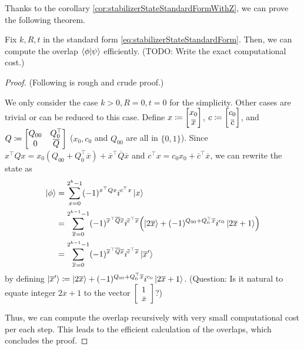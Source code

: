 \documentclass[\main/main]{subfiles}
\begin{document}
Thanks to the corollary \ref{cor:stabilizerStateStandardFormWithZ},
we can prove the following theorem.
\begin{theorem}
    Fix $k,R,t$ in the standard form \eqref{eq:stabilizerStateStandardForm}.
    Then, we can compute the overlap $\braket{\phi}{\psi}$ efficiently.
    (TODO: Write the exact computational cost.)
\end{theorem}
\begin{proof}
    (Following is rough and crude proof.)

    We only consider the case $k>0,R=0,t=0$ for the simplicity.
    Other cases are trivial or can be reduced to this case.
    Define $x \coloneqq \begin{bmatrix}
            x_0 \\
            \overline{x}
        \end{bmatrix}$,
    $c \coloneqq \begin{bmatrix}
            c_0 \\
            \overline{c}
        \end{bmatrix}$, and
    $Q \coloneqq \begin{bmatrix}
            Q_{00} & Q_{0}^\top   \\
            0      & \overline{Q}
        \end{bmatrix}$
    ($x_0,c_0$ and $Q_{00}$ are all in $\{0,1\}$).
    Since
    $x^\top Q x = x_0 (Q_{00}+Q_0^\top \overline{x}) + \overline{x}^\top \overline{Q} \overline{x}$
    and
    $c^\top x = c_0 x_0 + \overline{c}^\top \overline{x}$,
    we can rewrite the state as
    \begin{align*}
        \ket{\phi} & = \sum_{x=0}^{2^k-1} (-1)^{x^\top Q x} i^{c^\top x} \ket{x}                                                                                   \\
                   & = \sum_{\overline{x}=0}^{2^{k-1}-1} (-1)^{\overline{x}^\top \overline{Q} \overline{x}} i^{\overline{c}^\top \overline{x}}
        \qty(\ket{2\overline{x}} + (-1)^{Q_{00}+Q_0^\top \overline{x}} i^{c_0} \ket{2\overline{x}+1})                                                              \\
                   & = \sum_{\overline{x}=0}^{2^{k-1}-1} (-1)^{\overline{x}^\top \overline{Q} \overline{x}} i^{\overline{c}^\top \overline{x}} \ket{\overline{x}'}
    \end{align*}
    by defining $\ket{\overline{x}'} \coloneqq \ket{2\overline{x}} + (-1)^{Q_{00}+Q_0^\top \overline{x}} i^{c_0} \ket{2\overline{x}+1}$.
    (Question: Is it natural to equate integer $2\overline{x}+1$ to the vector $\begin{bmatrix} 1 \\ \overline{x} \end{bmatrix}$?)

    Thus, we can compute the overlap recursively
    with very small computational cost per each step.
    This leads to the efficient calculation of the overlaps,
    which concludes the proof.
\end{proof}
\end{document}
